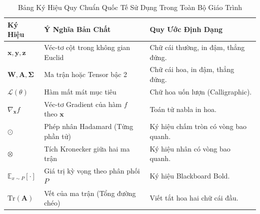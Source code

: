 \begin{table}[htbp]
\centering
\small
\caption{Bảng Ký Hiệu Quy Chuẩn Quốc Tế Sử Dụng Trong Toàn Bộ Giáo Trình}
\label{tab:app-math-symbols-list}
\begin{tabular}{p{2.5cm}p{4.5cm}p{6.0cm}}
\toprule
\textbf{Ký Hiệu} & \textbf{Ý Nghĩa Bản Chất} & \textbf{Quy Ước Định Dạng} \\
\midrule
$\mathbf{x}, \mathbf{y}, \mathbf{z}$ & Véc-tơ cột trong không gian Euclid & Chữ cái thường, in đậm, thẳng đứng. \\
$\mathbf{W}, \mathbf{A}, \mathbf{\Sigma}$ & Ma trận hoặc Tensor bậc 2 & Chữ cái hoa, in đậm, thẳng đứng. \\
$\mathcal{L}(\theta)$ & Hàm mất mát mục tiêu & Chữ hoa uốn lượn (Calligraphic). \\
$\nabla_{\mathbf{x}} f$ & Véc-tơ Gradient của hàm $f$ theo $\mathbf{x}$ & Toán tử nabla in hoa. \\
$\odot$ & Phép nhân Hadamard (Từng phần tử) & Ký hiệu chấm tròn có vòng bao quanh. \\
$\otimes$ & Tích Kronecker giữa hai ma trận & Ký hiệu nhân có vòng bao quanh. \\
$\mathbb{E}_{x \sim P}[\cdot]$ & Giá trị kỳ vọng theo phân phối $P$ & Ký hiệu Blackboard Bold. \\
$\text{Tr}(\mathbf{A})$ & Vết của ma trận (Tổng đường chéo) & Viết tắt hoa hai chữ cái đầu. \\
\bottomrule
\end{tabular}
\end{table}
